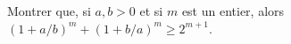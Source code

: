 Montrer que, si $a, b > 0$ et si $m$ est un entier, alors $(1 + a/b)^m + (1 + b/a)^m \geq 2^{m+1}$.
